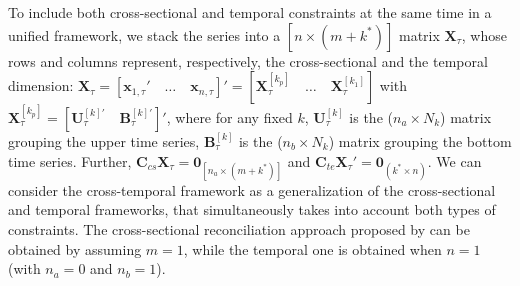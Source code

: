 \documentclass[a4paper,11pt]{article}
\newcommand{\xvet}{\bm{x}}
\newcommand{\Bvet}{\bm{B}}
\newcommand{\Cvet}{\bm{C}}
\newcommand{\Uvet}{\bm{U}}
\newcommand{\Xvet}{\bm{X}}
\newcommand{\Zerovet}{\bm{0}}
\theoremstyle{definition}
\begin{document}
To include both cross-sectional and temporal constraints at the same time in a unified framework, we stack the series into a $[n \times (m+k^\ast)]$ matrix $\Xvet_\tau$, whose rows and columns represent, respectively, the cross-sectional and the temporal dimension: $\Xvet_\tau = \left[\xvet_{1,\tau}'\quad \dots \quad \xvet_{n,\tau}\right]' = \left[\Xvet_{\tau}^{[k_p]} \quad \dots \quad \Xvet_{\tau}^{[k_1]}\right]$ with $\Xvet_{\tau}^{[k_p]} = \left[\Uvet_{\tau}^{[k]'} \quad
		\Bvet_{\tau}^{[k]'}\right]'$,
where for any fixed $k$,
$\Uvet_{\tau}^{[k]}$ is the ($n_a\times N_k$) matrix grouping the upper time series, $\Bvet_{\tau}^{[k]}$ is the ($n_b\times N_k$) matrix grouping the bottom time series. Further, $\Cvet_{cs}\Xvet_\tau = \Zerovet_{\left[n_a \times (m+k^\ast)\right]}$ and $\Cvet_{te}\Xvet_\tau' = \Zerovet_{(k^\ast \times n)} $. We can consider the cross-temporal framework as a generalization of the cross-sectional and temporal frameworks, that simultaneously takes into account both types of constraints. The cross-sectional reconciliation approach proposed by \cite{hyndman2011} can be obtained by assuming $m = 1$, while the temporal one \citep{athanasopoulos2017} is obtained when $n = 1$ (with $n_a = 0$ and $n_b = 1$).

%
\end{document}
